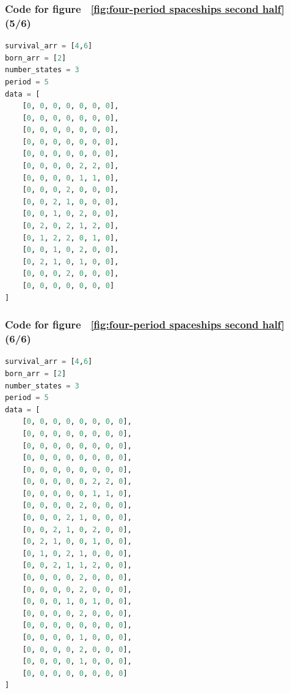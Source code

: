 \documentclass[12pt]{article}
\numberwithin{figure}{section} %
\begin{document}
\noindent\begin{minipage}{.45\textwidth}
\subsubsection{Code for figure ~\ref{fig:four-period spaceships second half} (5/6)}
\label{subsubsection:four-period spaceships(5/6)}
\begin{lstlisting}[language = Python]
survival_arr = [4,6]
born_arr = [2]
number_states = 3
period = 5
data = [
    [0, 0, 0, 0, 0, 0, 0],
    [0, 0, 0, 0, 0, 0, 0],
    [0, 0, 0, 0, 0, 0, 0],
    [0, 0, 0, 0, 0, 0, 0],
    [0, 0, 0, 0, 0, 0, 0],
    [0, 0, 0, 0, 2, 2, 0],
    [0, 0, 0, 0, 1, 1, 0],
    [0, 0, 0, 2, 0, 0, 0],
    [0, 0, 2, 1, 0, 0, 0],
    [0, 0, 1, 0, 2, 0, 0],
    [0, 2, 0, 2, 1, 2, 0],
    [0, 1, 2, 2, 0, 1, 0],
    [0, 0, 1, 0, 2, 0, 0],
    [0, 2, 1, 0, 1, 0, 0],
    [0, 0, 0, 2, 0, 0, 0],
    [0, 0, 0, 0, 0, 0, 0]
]
\end{lstlisting}
\end{minipage}\hfill
\begin{minipage}{.5\textwidth}
\subsubsection{Code for figure ~\ref{fig:four-period spaceships second half} (6/6)}
\label{subsubsection:four-period spaceships(6/6)}
\begin{lstlisting}[language = Python]
survival_arr = [4,6]
born_arr = [2]
number_states = 3
period = 5
data = [
    [0, 0, 0, 0, 0, 0, 0, 0],
    [0, 0, 0, 0, 0, 0, 0, 0],
    [0, 0, 0, 0, 0, 0, 0, 0],
    [0, 0, 0, 0, 0, 0, 0, 0],
    [0, 0, 0, 0, 0, 0, 0, 0],
    [0, 0, 0, 0, 0, 2, 2, 0],
    [0, 0, 0, 0, 0, 1, 1, 0],
    [0, 0, 0, 0, 2, 0, 0, 0],
    [0, 0, 0, 2, 1, 0, 0, 0],
    [0, 0, 2, 1, 0, 2, 0, 0],
    [0, 2, 1, 0, 0, 1, 0, 0],
    [0, 1, 0, 2, 1, 0, 0, 0],
    [0, 0, 2, 1, 1, 2, 0, 0],
    [0, 0, 0, 0, 2, 0, 0, 0],
    [0, 0, 0, 0, 2, 0, 0, 0],
    [0, 0, 0, 1, 0, 1, 0, 0],
    [0, 0, 0, 0, 2, 0, 0, 0],
    [0, 0, 0, 0, 0, 0, 0, 0],
    [0, 0, 0, 0, 1, 0, 0, 0],
    [0, 0, 0, 0, 2, 0, 0, 0],
    [0, 0, 0, 0, 1, 0, 0, 0],
    [0, 0, 0, 0, 0, 0, 0, 0]
]

\end{lstlisting}
\end{minipage}
\end{document}
